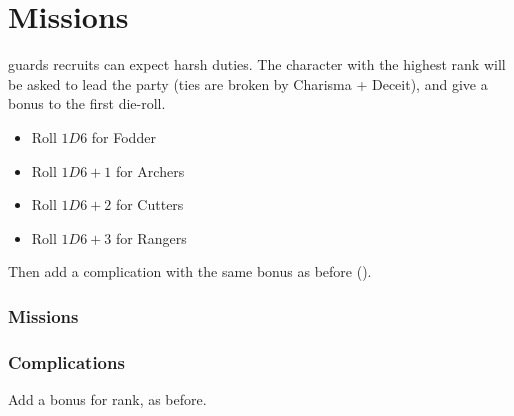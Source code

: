 \section{Missions}

\begin{multicols}{2}

\noindent
\Glspl{guard} recruits can expect harsh duties.
The character with the highest rank will be asked to lead the party (ties are broken by Charisma + Deceit), and give a bonus to the first die-roll.

\begin{itemize}
  \item
  Roll $1D6$ for Fodder
  \item
  Roll $1D6+1$ for Archers
  \item
  Roll $1D6+2$ for Cutters
  \item
  Roll $1D6+3$ for Rangers
\end{itemize}

Then add a complication with the same bonus as before ().

\subsubsection{Missions}

\ngMissions

\subsubsection{Complications}
\label{missionComplications}

Add a bonus for rank, as before.

\missionComplications

\end{multicols}
